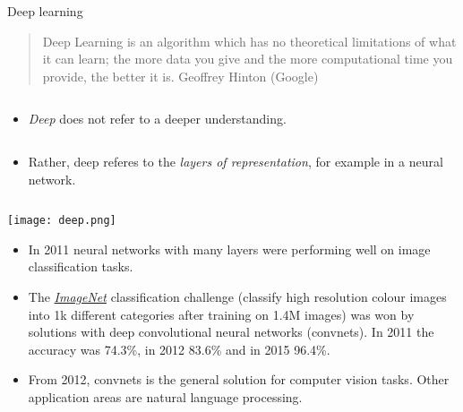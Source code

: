 \documentclass[
  10pt,
  ignorenonframetext,
]{beamer}
\providecommand{\tightlist}{%
  \setlength{\itemsep}{0pt}\setlength{\parskip}{0pt}}
\begin{document}
\begin{frame}
\begin{block}{Deep learning}
\protect\hypertarget{deep-learning}{}
\(~\)

\begin{quote}
Deep Learning is an algorithm which has no theoretical limitations of what it can learn; the more data you give and the more computational time you provide, the better it is. Geoffrey Hinton (Google)
\end{quote}

\(~\)

\begin{itemize}
\tightlist
\item
  \emph{Deep} does not refer to a deeper understanding.
\end{itemize}

\(~\)

\begin{itemize}
\tightlist
\item
  Rather, deep referes to the \emph{layers of representation}, for
  example in a neural network.
\end{itemize}

\(~\)

\center

\texttt{[image: deep.png]}
\end{block}
\end{frame}

\begin{frame}
\begin{itemize}
\tightlist
\item
  In 2011 neural networks with many layers were performing well on image
  classification tasks.
\end{itemize}

\vspace{2mm}

\begin{itemize}
\tightlist
\item
  The \href{http://www.image-net.org/}{\emph{ImageNet}} classification
  challenge (classify high resolution colour images into 1k different
  categories after training on 1.4M images) was won by solutions with
  deep convolutional neural networks (convnets). In 2011 the accuracy
  was 74.3\%, in 2012 83.6\% and in 2015 96.4\%.
\end{itemize}

\vspace{2mm}

\begin{itemize}
\tightlist
\item
  From 2012, convnets is the general solution for computer vision tasks.
  Other application areas are natural language processing.
\end{itemize}
\end{frame}
\end{document}
